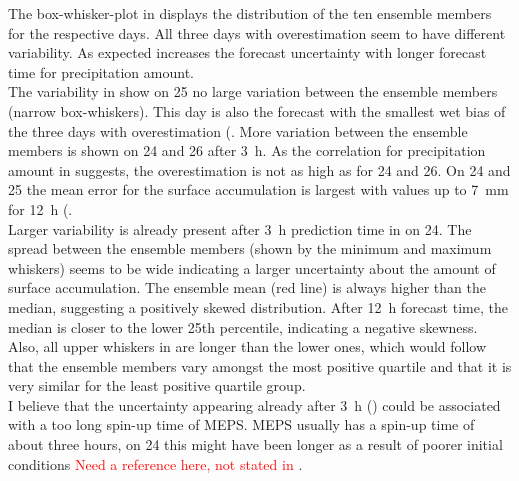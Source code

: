 \noindent
The box-whisker-plot in  displays the distribution of the ten ensemble members for the respective days. All three days with overestimation seem to have different variability. As expected increases the forecast uncertainty with longer forecast time for precipitation amount.  
\\
The variability in  show on \SI{25}{\dec} no large variation between the ensemble members (narrow box-whiskers). This day is also the forecast with the smallest wet bias of the three days with overestimation (. More variation between the ensemble members is shown on \num{24} and \SI{26}{\dec} after \SI{3}{\hour}.
As the correlation for precipitation amount in  suggests, the overestimation is not as high as for \num{24} and \SI{26}{\dec}. On \num{24} and \SI{25}{\dec} the mean error for the surface accumulation is largest with values up to \SI{7}{\mm} for \SI{12}{\hour} (. 
\\
Larger variability is already present after \SI{3}{\hour} prediction time in  on \SI{24}{\dec}. The spread between the ensemble members (shown by the minimum and maximum whiskers) seems to be wide indicating a larger uncertainty about the amount of surface accumulation. The ensemble mean (red line) is always higher than the median, suggesting a positively skewed distribution. After \SI{12}{\hour} forecast time, the median is closer to the lower 25th percentile, indicating a negative skewness. Also, all upper whiskers in  are longer than the lower ones, which would follow that the ensemble members vary amongst the most positive quartile and that it is very similar for the least positive quartile group. 
\\
I believe that the uncertainty appearing already after \SI{3}{\hour} () could be associated with a too long spin-up time of MEPS. MEPS usually has a spin-up time of about three hours, on \SI{24}{\dec} this might have been longer as a result of poorer initial conditions \textcolor{red}{Need a reference here, not stated in \citet{muller_arome-metcoop:_2017}}. 
